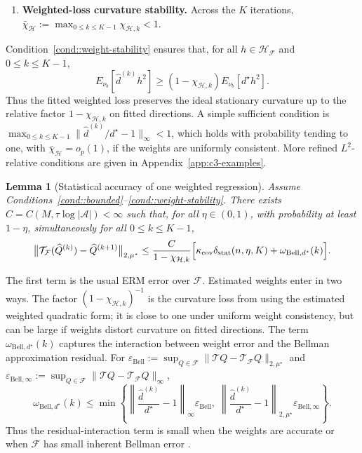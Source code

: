 \documentclass{article}
\theoremstyle{plain}
\newtheorem{lemma}{Lemma}
\theoremstyle{definition}
\theoremstyle{remark}
\begin{document}
\begin{enumerate}[label=\textbf{C\arabic*)}, ref={C\arabic*}, leftmargin=1.5em, resume=cond]
\item \label{cond::weight-stability}
\textbf{Weighted-loss curvature stability.}
Across the \(K\) iterations, $\bar\chi_{\mathcal H}
:=
\max_{0\le k\le K-1}\chi_{\mathcal H,k}
<1.$
\end{enumerate}

Condition~\ref{cond::weight-stability} ensures that, for all
\(h\in\mathcal H_{\mathcal F}\) and \(0\le k\le K-1\),
\[
E_{\nu_b}[\widehat d^{(k)}h^2]
\ge
(1-\chi_{\mathcal H,k})E_{\nu_b}[d^\star h^2].
\]
Thus the fitted weighted loss preserves the ideal stationary curvature up to the
relative factor \(1-\chi_{\mathcal H,k}\) on fitted directions. A
simple sufficient condition is
\(\max_{0\le k\le K-1}
\|\widehat d^{(k)}/d^\star-1\|_\infty<1\), which holds with probability tending to one, with
\(\bar\chi_{\mathcal H} = o_p(1)\), if the weights are uniformly
consistent. More refined \(L^2\)-relative conditions are given in
Appendix~\ref{app:c3-examples}.


\begin{lemma}[Statistical accuracy of one weighted regression]
\label{lemma::errorperiter}
Assume Conditions~\ref{cond::bounded}--\ref{cond::weight-stability}.
There exists $C=C(M,\tau\log|\mathcal A|)<\infty$
such that, for all \(\eta\in(0,1)\), with probability at least \(1-\eta\),
simultaneously for all \(0\le k\le K-1\),
\[
\bigl\|
\mathcal T_{\mathcal F}(\widehat Q^{(k)})-\widehat Q^{(k+1)}
\bigr\|_{2,\mu^\star}
\le
\frac{C}{1-\chi_{\mathcal H,k}}
\Bigl[
\kappa_{\mathrm{cov}}\delta_{\mathrm{stat}}(n,\eta,K)
+\omega_{\mathrm{Bell},d^\star}(k)
\Bigr].
\]
\end{lemma}

The first term is the usual ERM error over \(\mathcal F\). Estimated weights
enter in two ways. The factor \((1-\chi_{\mathcal H,k})^{-1}\) is the curvature
loss from using the estimated weighted quadratic form; it is close to one under
uniform weight consistency, but can be large if weights distort curvature on
fitted directions. The term \(\omega_{\mathrm{Bell},d^\star}(k)\) captures the
interaction between weight error and the Bellman approximation residual. For
\(\varepsilon_{\mathrm{Bell}}
:=\sup_{Q\in\mathcal F}\|\mathcal TQ-\mathcal T_{\mathcal F}Q\|_{2,\mu^\star}\)
and
\(\varepsilon_{\mathrm{Bell},\infty}
:=\sup_{Q\in\mathcal F}\|\mathcal TQ-\mathcal T_{\mathcal F}Q\|_{\infty}\),
\[
\omega_{\mathrm{Bell},d^\star}(k)
\le
\min\left\{
\left\|\frac{\widehat d^{(k)}}{d^\star}-1\right\|_\infty
\varepsilon_{\mathrm{Bell}},
\;
\left\|\frac{\widehat d^{(k)}}{d^\star}-1\right\|_{2,\mu^\star}
\varepsilon_{\mathrm{Bell},\infty}
\right\}.
\]
Thus the residual-interaction term is small when the weights are accurate or
when \(\mathcal F\) has small inherent Bellman error
\citep{munos2008finite}.
\end{document}
